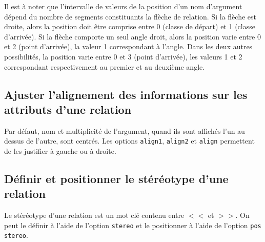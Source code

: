 \documentclass[a4paper,11pt]{report}
\newcommand{\inputTikZ}[1]{%
  }%
\newcommand{\inputTikZ}[1]{%
    \texttt{[image: fig/\#1.pdf]}%
  }%
\begin{document}
\medskip

Il est à noter que l'intervalle de valeurs de la position d'un nom d'argument dépend du nombre de segments constituants la flèche de relation. Si la flèche est droite, alors la position doit être comprise entre 0 (classe de départ) et 1 (classe d'arrivée). Si la flèche comporte un seul angle droit, alors la position varie entre 0 et 2 (point d'arrivée), la valeur 1 correspondant à l'angle. Dans les deux autres possibilités, la position varie entre 0 et 3 (point d'arrivée), les valeurs 1 et 2 correspondant respectivement au premier et au deuxième angle.

\subsection{Ajuster l'alignement des informations sur les attributs d'une relation}\label{ss.relalign}

Par défaut, nom et multiplicité de l'argument, quand ils sont affichés l'un au dessus de l'autre, sont centrés. Les options {\tt align1}, {\tt align2} et {\tt align} permettent de les justifier à gauche ou à droite.

\medskip

\begin{minipage}{0.5\textwidth}

\end{minipage}
\begin{minipage}{0.4\textwidth}
\begin{center}
\inputTikZ{relationalign}
\end{center}
\end{minipage}

\subsection{Définir et positionner le stéréotype d'une relation}\label{ss.relstereo}

Le stéréotype d'une relation est un mot clé contenu entre $<<$ et $>>$. On peut le définir à l'aide de l'option {\tt stereo} et le positionner à l'aide de l'option \hypertarget{posstereo}{{\tt pos stereo}}.

\medskip

\begin{minipage}{0.5\textwidth}

\end{minipage}
\begin{minipage}{0.4\textwidth}
\begin{center}
\inputTikZ{relationstereo}
\end{center}
\end{minipage}
\end{document}
